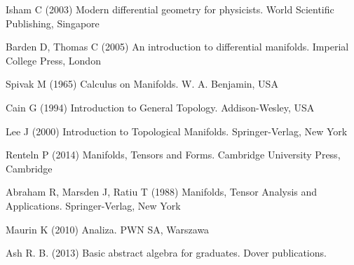 
%
% 
% 
%
\begin{thebibliography}{99.}
%
%
%
 Isham C (2003)
Modern differential geometry for physicists.
World Scientific Publishing, Singapore

 Barden D, Thomas C (2005)
An introduction to differential manifolds.
Imperial College Press, London

 Spivak M (1965)
Calculus on Manifolds.
W. A. Benjamin, USA

 Cain G (1994)
Introduction to General Topology.
Addison-Wesley, USA

 Lee J (2000)
Introduction to Topological Manifolds.
Springer-Verlag, New York

 Renteln P (2014)
Manifolds, Tensors and Forms.
Cambridge University Press, Cambridge

 Abraham R, Marsden J, Ratiu T (1988)
Manifolds, Tensor Analysis and Applications.
Springer-Verlag, New York

 Maurin K (2010)
Analiza.
PWN SA, Warszawa

 Ash R. B. (2013)
Basic abstract algebra for graduates.
Dover publications.

%
%

\end{thebibliography}
